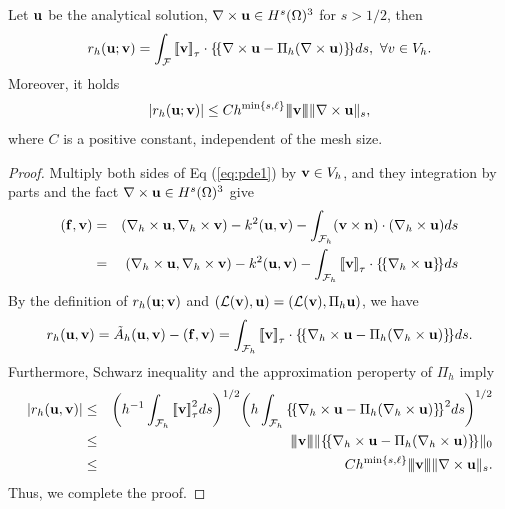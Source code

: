 \documentclass[final,leqno]{siamltex704}
\newcommand{\bn}{{\bf n}}
\newcommand{\bv}{{\bf v}}
\def\bbf{{\bf f}}
\def\bn{{\bf n}}
\def\bu{{\bf u}}
\def\bv{{\bf v}}
\def\mL{{\mathcal L}}
\def\mF{\mathcal{F}}
\def\ljump{{[\![}}
\def\rjump{{]\!]}}
\def\lavg{{\{\!\{}}
\def\ravg{{\}\!\}}}
\def\3bar{{|\hspace{-.02in}|\hspace{-.02in}|}}
\begin{document}
\begin{lemma}
Let $\bu$ be the analytical solution, $\nabla\times\bu\in H^s(\Omega)^3$ for $s>1/2$, then
\begin{eqnarray}
r_h(\bu;\bv)=\int_{\mF}\ljump\bv\rjump_{\tau}\cdot\lavg\nabla\times\bu-\Pi_h(\nabla\times\bu) \ravg ds,\ \forall v\in V_h.
\end{eqnarray}
Moreover, it holds
\begin{eqnarray}
|r_h(\bu;\bv)|\le Ch^{\min\{s,\ell\}}\3bar\bv\3bar \|\nabla\times\bu\|_s,
\end{eqnarray}
where $C$ is a positive constant, independent of the mesh size.
\end{lemma}
\begin{proof}
Multiply both sides of Eq (\ref{eq:pde1}) by $\bv\in V_h$, and they integration by parts and the fact $\nabla\times\bu\in H^s(\Omega)^3$ give
\begin{eqnarray*}
(\bbf,\bv) 
%
&=& (\nabla_h\times\bu,\nabla_h\times\bv)-k^2(\bu,\bv)-\int_{\mF_h}(\bv\times\bn)\cdot (\nabla_h\times\bu)  ds \\
%
&=& (\nabla_h\times\bu,\nabla_h\times\bv)-k^2(\bu,\bv)-\int_{\mF_h}\ljump\bv\rjump_{\tau}\cdot \lavg\nabla_h\times\bu\ravg  ds
\end{eqnarray*}
By the definition of $r_h(\bu;\bv)$ and $(\mL(\bv),\bu)=(\mL(\bv),\Pi_h\bu)$, we have
\begin{eqnarray*}
r_h(\bu,\bv) = \tilde{A}_h(\bu,\bv)-(\bbf,\bv) 
%
= \int_{\mF_h}\ljump\bv\rjump_{\tau}\cdot \lavg\nabla_h\times\bu-\Pi_h(\nabla_h\times\bu)\ravg ds.
\end{eqnarray*}
Furthermore, Schwarz inequality and the approximation peroperty of $\Pi_h$ imply
\begin{eqnarray*}
|r_h(\bu,\bv)|
%
&\le& \bigg(h^{-1}\int_{\mF_h}\ljump\bv\rjump_{\tau}^2 ds\bigg)^{1/2}\bigg(h\int_{\mF_h}\lavg\nabla_h\times\bu-\Pi_h(\nabla_h\times\bu)\ravg^2 ds\bigg)^{1/2}\\
%
&\le& \3bar\bv\3bar \|\lavg\nabla_h\times\bu-\Pi_h(\nabla_h\times\bu)\ravg\|_0\\
%
&\le& Ch^{\min\{s,\ell\}}\3bar\bv\3bar \|\nabla\times\bu\|_s.
\end{eqnarray*}
Thus, we complete the proof.
\end{proof}
\end{document}
